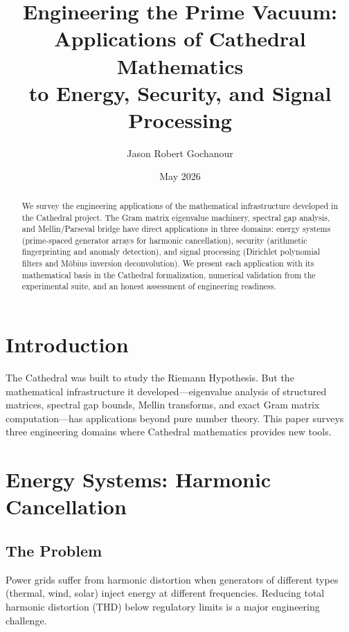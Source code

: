 \documentclass[11pt,a4paper]{article}
\title{%
  Engineering the Prime Vacuum:\\
  Applications of Cathedral Mathematics\\
  to Energy, Security, and Signal Processing%
}
\author{Jason Robert Gochanour}
\date{May 2026}
\begin{document}
\maketitle

\begin{abstract}
We survey the engineering applications of the mathematical
infrastructure developed in the Cathedral project. The Gram matrix
eigenvalue machinery, spectral gap analysis, and Mellin/Parseval
bridge have direct applications in three domains: energy systems
(prime-spaced generator arrays for harmonic cancellation),
security (arithmetic fingerprinting and anomaly detection), and
signal processing (Dirichlet polynomial filters and M\"obius
inversion deconvolution). We present each application with
its mathematical basis in the Cathedral formalization, numerical
validation from the experimental suite, and an honest assessment
of engineering readiness.
\end{abstract}

\tableofcontents

\section{Introduction}

The Cathedral was built to study the Riemann Hypothesis. But the
mathematical infrastructure it developed---eigenvalue analysis of
structured matrices, spectral gap bounds, Mellin transforms, and
exact Gram matrix computation---has applications beyond pure number
theory. This paper surveys three engineering domains where Cathedral
mathematics provides new tools.

\section{Energy Systems: Harmonic Cancellation}

\subsection{The Problem}

Power grids suffer from harmonic distortion when generators of
different types (thermal, wind, solar) inject energy at different
frequencies. Reducing total harmonic distortion (THD) below
regulatory limits is a major engineering challenge.
\end{document}
